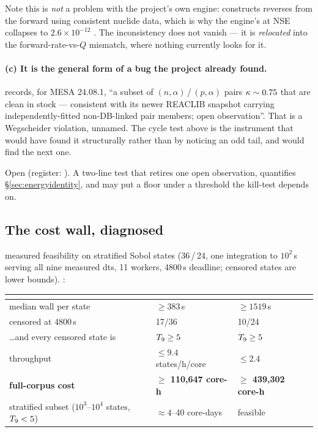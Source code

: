 Note this is \emph{not} a problem with the project's own engine:
 constructs reverses from the forward using consistent nuclide
data, which is why the engine's \kap{} at NSE collapses to
$2.6\times10^{-12}$ . The inconsistency does not vanish
--- it is \emph{relocated} into the forward-rate-vs-$Q$ mismatch, where nothing
currently looks for it.

\paragraph{(c) It is the general form of a bug the project already found.}
 records, for MESA 24.08.1, ``a subset of
$(n,\alpha)$\,/\,$(p,\alpha)$ pairs $\kappa \sim 0.75$ that are clean in stock ---
consistent with its newer REACLIB snapshot carrying independently-fitted
non-DB-linked pair members; open observation''. That is a Wegscheider violation,
unnamed. The cycle test above is the instrument that would have found it
structurally rather than by noticing an odd \kap{} tail, and would find the next
one.

Open (register: ). A two-line test that retires one open observation,
quantifies \S\ref{sec:energyidentity}, and may put a floor under a threshold the
kill-test depends on.

\subsection{The cost wall, diagnosed}
\label{sec:costwall}

 measured feasibility on stratified
Sobol states (36\,/\,24, one integration to $10^{2}$\,s serving all nine
measured dts, 11 workers, 4800\,s deadline; censored states are lower bounds).
:

\begin{center}
\begin{tabularx}{\textwidth}{@{}Y L{3.4cm} L{3.4cm}@{}}
\toprule
 & \textbf{} & \textbf{} \\
\midrule
median wall per state & $\ge 383$\,s & $\ge 1519$\,s \\
censored at 4800\,s & 17/36 & 10/24 \\
\ldots and every censored state is & $T_{9} \ge 5$ & $T_{9} \ge 5$ \\
throughput & $\le 9.4$ states/h/core & $\le 2.4$ \\
\textbf{full-corpus cost} & \textbf{$\ge$ 110,647 core-h} &
  \textbf{$\ge$ 439,302 core-h} \\
stratified subset ($10^{3}$--$10^{4}$ states, $T_{9} < 5$) &
  $\approx 4$--40 core-days & feasible \\
\bottomrule
\end{tabularx}
\end{center}

